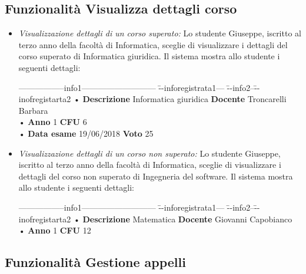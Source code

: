 \subsection{Funzionalità Visualizza dettagli corso}
\begin{itemize}
	\item \textit{Visualizzazione dettagli di un corso superato:}
	Lo studente Giuseppe, iscritto al terzo anno della facoltà di Informatica, sceglie di visualizzare i dettagli del corso superato di Informatica giuridica. Il sistema mostra allo studente i seguenti dettagli:
	\begin{tabbing}
		\hspace{1cm}-----------------info1--------------------------- \= --inforegistrata1--- \= --info2--\=--inofregistarta2 \kill
		\hspace{1cm} • \textbf{Descrizione} Informatica giuridica \> \textbf{Docente} Troncarelli Barbara\\
		\hspace{1cm} • \textbf{Anno} 1 \> \textbf{CFU} 6   \\
		\hspace{1cm} • \textbf{Data esame} 19/06/2018 \> \textbf{Voto} 25 \\
	\end{tabbing}

	\item \textit{Visualizzazione dettagli di un corso non superato:}
	Lo studente Giuseppe, iscritto al terzo anno della facoltà di Informatica, sceglie di visualizzare i dettagli del corso non superato di Ingegneria del software. Il sistema mostra allo studente i seguenti dettagli:
	\begin{tabbing}
		\hspace{1cm}-----------------info1--------------------------- \= --inforegistrata1--- \= --info2--\=--inofregistarta2 \kill
		\hspace{1cm} • \textbf{Descrizione} Matematica \> \textbf{Docente} Giovanni  Capobianco\\
		\hspace{1cm} • \textbf{Anno} 1 \> \textbf{CFU} 12  \\
	\end{tabbing}
\end{itemize}

\subsection{Funzionalità Gestione appelli}
